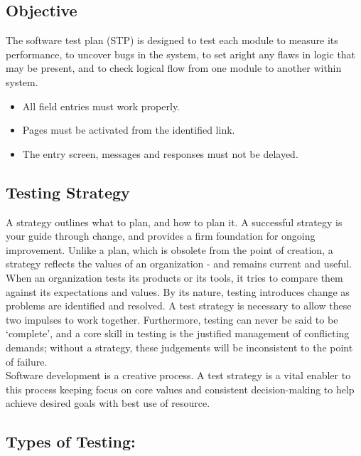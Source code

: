 \documentclass[12pt]{report}
\begin{document}
\subsection{Objective
}
\justifying
\setlength{\parindent}{4em}
\setlength{\parskip}{0.5em}
\renewcommand{\baselinestretch}{1.5}
\normalsize

The software test plan (STP) is designed to test each module to measure its performance, to 
uncover bugs in the system, to set aright any flaws in logic that may be present, and to check 
logical flow from one module to another within system.
\begin{itemize}
\item All field entries must work properly.
\item Pages must be activated from the identified link.
\item The entry screen, messages and responses must not be delayed.

\end {itemize}


\subsection{Testing Strategy
}
\justifying
\setlength{\parindent}{4em}
\setlength{\parskip}{0.5em}
\renewcommand{\baselinestretch}{1.5}
\normalsize

A strategy outlines what to plan, and how to plan it. A successful strategy is your guide 
through change, and provides a firm foundation for ongoing improvement. Unlike a plan, 
which is obsolete from the point of creation, a strategy reflects the values of an organization 
- and remains current and useful. When an organization tests its products or its tools, it tries 
to compare them against its expectations and values. By its nature, testing introduces change 
as problems are identified and resolved. A test strategy is necessary to allow these two 
impulses to work together. Furthermore, testing can never be said to be ‘complete’, and a 
core skill in testing is the justified management of conflicting demands; without a strategy, 
these judgements will be inconsistent to the point of failure.\\
Software development is a creative process. A test strategy is a vital enabler to this process 
keeping focus on core values and consistent decision-making to help achieve desired goals 
with best use of resource. 

\subsection{ Types of Testing:
}
\justifying
\setlength{\parindent}{4em}
\setlength{\parskip}{0.5em}
\renewcommand{\baselinestretch}{1.5}
\normalsize
\end{document}
